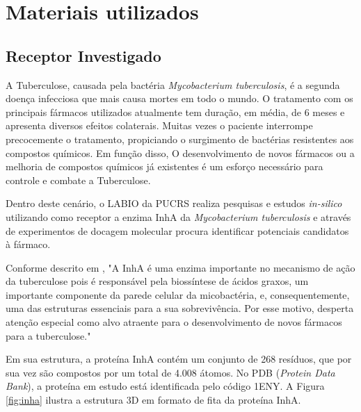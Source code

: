 \chapter{Materiais utilizados}

\section{Receptor Investigado}

A Tuberculose, causada pela bactéria \emph{Mycobacterium tuberculosis}, é a segunda doença infecciosa que mais causa mortes em todo o mundo. O tratamento com os principais fármacos utilizados atualmente tem duração, em média, de 6 meses e apresenta diversos efeitos colaterais. Muitas vezes o paciente interrompe precocemente o tratamento, propiciando o surgimento de bactérias resistentes aos compostos químicos. Em função disso, O desenvolvimento de novos fármacos ou a melhoria de compostos químicos já existentes é um esforço necessário para controle e combate a Tuberculose.

Dentro deste cenário, o LABIO da PUCRS realiza pesquisas e estudos \emph{in-silico} utilizando como receptor a enzima InhA da \emph{Mycobacterium tuberculosis} e através de experimentos de docagem molecular procura identificar potenciais candidatos à fármaco. 

Conforme descrito em \cite{kar11}, "A InhA é uma enzima importante no mecanismo de ação da tuberculose pois é responsável pela biossíntese de ácidos graxos, um importante componente da parede celular da micobactéria, e, consequentemente, uma das estruturas essenciais para a sua sobrevivência. Por esse motivo, desperta atenção especial como alvo atraente para o desenvolvimento de novos fármacos para a tuberculose."

Em sua estrutura, a proteína InhA contém um conjunto de 268 resíduos, que por sua vez são compostos por um total de 4.008 átomos. No PDB (\emph{Protein Data Bank}), a proteína em estudo está identificada pelo código 1ENY. A Figura \ref{fig:inha} ilustra a estrutura 3D em formato de fita da proteína InhA.

